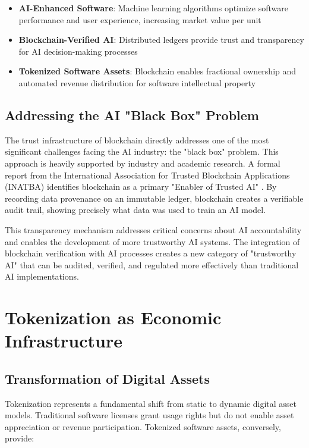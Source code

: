 \documentclass[11pt]{article}
\begin{document}
\begin{itemize}
\item \textbf{AI-Enhanced Software}: Machine learning algorithms optimize software performance and user experience, increasing market value per unit
\item \textbf{Blockchain-Verified AI}: Distributed ledgers provide trust and transparency for AI decision-making processes
\item \textbf{Tokenized Software Assets}: Blockchain enables fractional ownership and automated revenue distribution for software intellectual property
\end{itemize}

\subsection{Addressing the AI "Black Box" Problem}

The trust infrastructure of blockchain directly addresses one of the most significant challenges facing the AI industry: the "black box" problem. This approach is heavily supported by industry and academic research. A formal report from the International Association for Trusted Blockchain Applications (INATBA) identifies blockchain as a primary "Enabler of Trusted AI" \cite{inatba_trusted_ai_2023}. By recording data provenance on an immutable ledger, blockchain creates a verifiable audit trail, showing precisely what data was used to train an AI model.

This transparency mechanism addresses critical concerns about AI accountability and enables the development of more trustworthy AI systems. The integration of blockchain verification with AI processes creates a new category of "trustworthy AI" that can be audited, verified, and regulated more effectively than traditional AI implementations.

\section{Tokenization as Economic Infrastructure}

\subsection{Transformation of Digital Assets}

Tokenization represents a fundamental shift from static to dynamic digital asset models. Traditional software licenses grant usage rights but do not enable asset appreciation or revenue participation. Tokenized software assets, conversely, provide:
\end{document}
